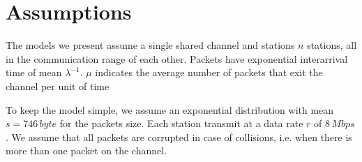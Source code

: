 \section{Assumptions}
\label{sec:assumptions}

The models we present assume a single shared channel and stations $n$ stations, all in the communication range of each other.
Packets have exponential interarrival time of mean $\lambda^{-1}$.
$\mu$ indicates the average number of packets that exit the channel per unit of time

To keep the model simple, we assume an exponential distribution with mean $s=746\, byte$ for the packets size.
Each station transmit at a data rate $r$ of $8\, Mbps$.
We assume that all packets are corrupted in case of collisions, i.e. when there is more than one packet on the channel.
